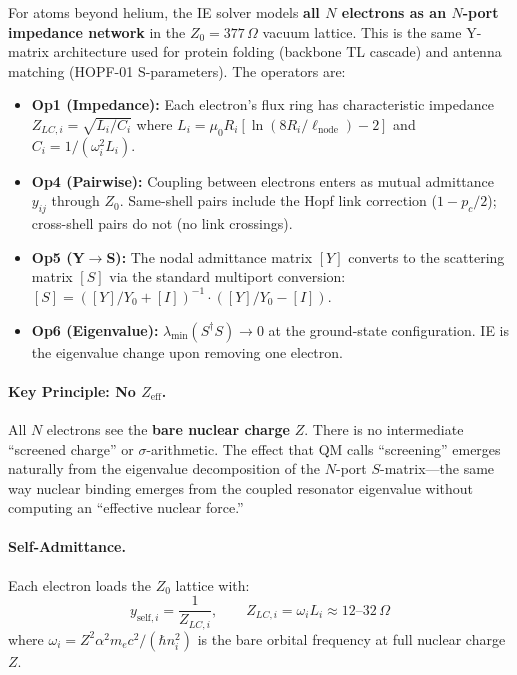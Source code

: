 For atoms beyond helium, the IE solver models \textbf{all $N$ electrons
as an $N$-port impedance network} in the $Z_0 = 377\,\Omega$ vacuum
lattice. This is the same Y-matrix architecture used for protein
folding (backbone TL cascade) and antenna matching (HOPF-01 S-parameters).
The operators are:
\begin{itemize}
    \item \textbf{Op1 (Impedance):} Each electron's flux ring has
          characteristic impedance $Z_{LC,i} = \sqrt{L_i/C_i}$
          where $L_i = \mu_0 R_i [\ln(8R_i/\ell_{\text{node}}) - 2]$
          and $C_i = 1/(\omega_i^2 L_i)$.
    \item \textbf{Op4 (Pairwise):} Coupling between electrons enters
          as mutual admittance $y_{ij}$ through $Z_0$. Same-shell
          pairs include the Hopf link correction ($1 - p_c/2$);
          cross-shell pairs do not (no link crossings).
    \item \textbf{Op5 (Y$\to$S):} The nodal admittance matrix
          $[Y]$ converts to the scattering matrix $[S]$ via the
          standard multiport conversion:
          $[S] = ([Y]/Y_0 + [I])^{-1} \cdot ([Y]/Y_0 - [I])$.
    \item \textbf{Op6 (Eigenvalue):} $\lambda_{\min}(S^\dagger S) \to 0$
          at the ground-state configuration. IE is the eigenvalue
          change upon removing one electron.
\end{itemize}

\paragraph{Key Principle: No $Z_{\text{eff}}$.}
All $N$ electrons see the \textbf{bare nuclear charge} $Z$.
There is no intermediate ``screened charge'' or $\sigma$-arithmetic.
The effect that QM calls ``screening'' emerges naturally from the
eigenvalue decomposition of the $N$-port $S$-matrix---the same way
nuclear binding emerges from the coupled resonator eigenvalue
without computing an ``effective nuclear force.''

\paragraph{Self-Admittance.}
Each electron loads the $Z_0$ lattice with:
\begin{equation}
    y_{\text{self},i} = \frac{1}{Z_{LC,i}}, \qquad
    Z_{LC,i} = \omega_i L_i \approx 12\text{--}32\,\Omega
    \label{eq:self_admittance}
\end{equation}
where $\omega_i = Z^2 \alpha^2 m_e c^2 / (\hbar n_i^2)$ is the
bare orbital frequency at full nuclear charge $Z$.

